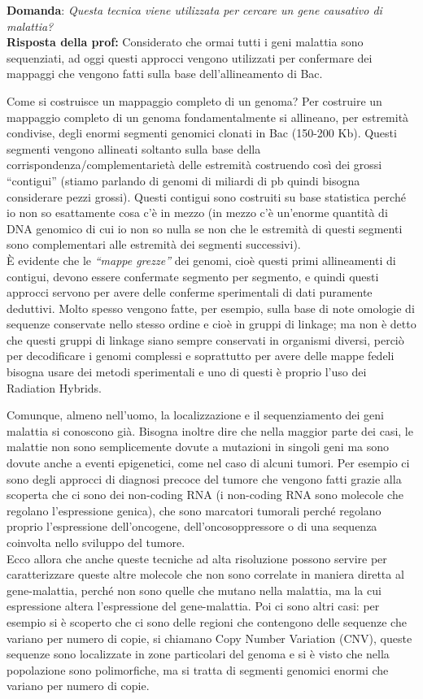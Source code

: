 \documentclass[11pt]{book}
\begin{document}
\textbf{Domanda}: \emph{Questa tecnica viene utilizzata per cercare un gene causativo di malattia?}\\
\textbf{Risposta della prof:} Considerato che ormai tutti i geni malattia sono sequenziati, ad oggi questi approcci vengono utilizzati per confermare dei mappaggi che vengono fatti sulla base dell’allineamento di Bac.

Come si costruisce un mappaggio completo di un genoma? Per costruire un mappaggio completo di un genoma fondamentalmente si allineano, per estremità condivise, degli enormi segmenti genomici clonati in Bac (150-200 Kb). Questi segmenti vengono allineati soltanto sulla base della corrispondenza/complementarietà delle estremità costruendo così dei grossi ``contigui'' (stiamo parlando di genomi di miliardi di pb quindi bisogna considerare pezzi grossi). Questi contigui sono costruiti su base statistica perché io non so esattamente cosa c’è in mezzo (in mezzo c’è un’enorme quantità di DNA genomico di cui io non so nulla se non che le estremità di questi segmenti sono complementari alle estremità dei segmenti successivi).\\
È evidente che le \emph{``mappe grezze''} dei genomi, cioè questi primi allineamenti di contigui, devono essere confermate segmento per segmento, e quindi questi approcci servono per avere delle conferme sperimentali di dati puramente deduttivi.
Molto spesso vengono fatte, per esempio, sulla base di note omologie di sequenze conservate nello stesso ordine e cioè in gruppi di linkage; ma non è detto che questi gruppi di linkage siano sempre conservati in organismi diversi, perciò per decodificare i genomi complessi e soprattutto per avere delle mappe fedeli bisogna usare dei metodi sperimentali e uno di questi è proprio l’uso dei Radiation Hybrids.

Comunque, almeno nell’uomo, la localizzazione e il sequenziamento dei geni malattia si conoscono già. Bisogna inoltre dire che nella maggior parte dei casi, le malattie non sono semplicemente dovute a mutazioni in singoli geni ma sono dovute anche a eventi epigenetici, come nel caso di alcuni tumori. Per esempio ci sono degli approcci di diagnosi precoce del tumore che vengono fatti grazie alla scoperta che ci sono dei non-coding RNA (i non-coding RNA sono molecole che regolano l’espressione genica), che sono marcatori tumorali perché regolano proprio l’espressione dell’oncogene, dell’oncosoppressore o di una sequenza coinvolta nello sviluppo del tumore.\\
Ecco allora che anche queste tecniche ad alta risoluzione possono servire per caratterizzare queste altre molecole che non sono correlate in maniera diretta al gene-malattia, perché non sono quelle che mutano nella malattia, ma la cui espressione altera l’espressione del gene-malattia. 
Poi ci sono altri casi: per esempio si è scoperto che ci sono delle regioni che contengono delle sequenze che variano per numero di copie, si chiamano Copy Number Variation (CNV), queste sequenze sono localizzate in zone particolari del genoma e si è visto che nella popolazione sono polimorfiche, ma si tratta di segmenti genomici enormi che variano per numero di copie.
\end{document}
